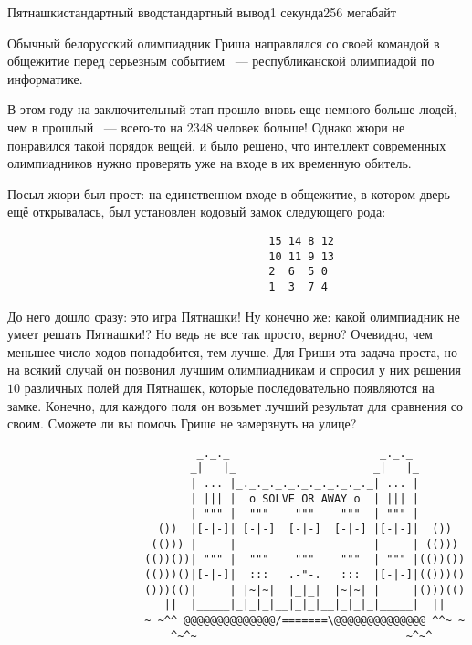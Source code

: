 \begin{problem}{Пятнашки}{стандартный ввод}{стандартный вывод}{1 секунда}{256 мегабайт}

Обычный белорусский олимпиадник Гриша направлялся со своей командой в общежитие перед серьезным событием ~--- республиканской олимпиадой по информатике.

В этом году на заключительный этап прошло вновь еще немного больше людей, чем в прошлый ~--- всего-то на $2348$ человек больше! Однако жюри не понравился такой порядок вещей, и было решено, что интеллект современных олимпиадников нужно проверять уже на входе в их временную обитель.

Посыл жюри был прост: на единственном входе в общежитие, в котором дверь ещё открывалась, был установлен кодовый замок следующего рода:


\begin{verbatim}
                                        15 14 8 12
                                        10 11 9 13
                                        2  6  5 0
                                        1  3  7 4
\end{verbatim}


До него дошло сразу: это игра Пятнашки! Ну конечно же: какой олимпиадник не умеет решать Пятнашки!? Но ведь не все так просто, верно? Очевидно, чем меньшее число ходов понадобится, тем лучше. Для Гриши эта задача проста, но на всякий случай он позвонил лучшим олимпиадникам и спросил у них решения $10$ различных полей для Пятнашек, которые последовательно появляются на замке. Конечно, для каждого поля он возьмет лучший результат для сравнения со своим. Сможете ли вы помочь Грише не замерзнуть на улице?


\begin{verbatim}
                             _._._                       _._._
                            _|   |_                     _|   |_
                            | ... |_._._._._._._._._._._| ... |
                            | ||| |  o SOLVE OR AWAY o  | ||| |
                            | """ |  """    """    """  | """ |
                       ())  |[-|-]| [-|-]  [-|-]  [-|-] |[-|-]|  ())
                      (())) |     |---------------------|     | (()))
                     (())())| """ |  """    """    """  | """ |(())())
                     (()))()|[-|-]|  :::   .-"-.   :::  |[-|-]|(()))()
                     ()))(()|     | |~|~|  |_|_|  |~|~| |     |()))(()
                        ||  |_____|_|_|_|__|_|_|__|_|_|_|_____|  ||
                     ~ ~^^ @@@@@@@@@@@@@@/=======\@@@@@@@@@@@@@@ ^^~ ~
                         ^~^~                                ~^~^
\end{verbatim}


\end{problem}
